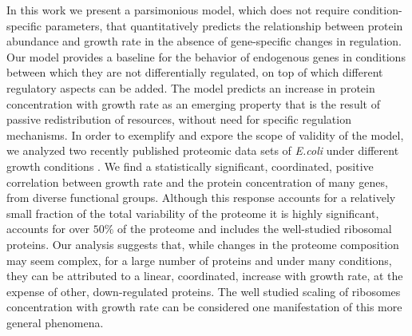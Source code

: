 In this work we present a parsimonious model, which does not require condition-specific parameters, that quantitatively predicts the relationship between protein abundance and growth rate in the absence of gene-specific changes in regulation.
Our model provides a baseline for the behavior of endogenous genes in conditions between which they are not differentially regulated, on top of which different regulatory aspects can be added.
The model predicts an increase in protein concentration with growth rate as an emerging property that is the result of passive redistribution of resources, without need for specific regulation mechanisms.
In order to exemplify and expore the scope of validity of the model, we analyzed two recently published proteomic data sets of \emph{E.coli} under different growth conditions \cite{Valgepea2013,Heinemann2015}.
We find a statistically significant, coordinated, positive correlation between growth rate and the protein concentration of many genes, from diverse functional groups.
Although this response accounts for a relatively small fraction of the total variability of the proteome it is highly significant, accounts for over $50\%$ of the proteome and includes the well-studied ribosomal proteins.
Our analysis suggests that, while changes in the proteome composition may seem complex, for a large number of proteins and under many conditions, they can be attributed to a linear, coordinated, increase with growth rate, at the expense of other, down-regulated proteins.
The well studied scaling of ribosomes concentration with growth rate can be considered one manifestation of this more general phenomena.